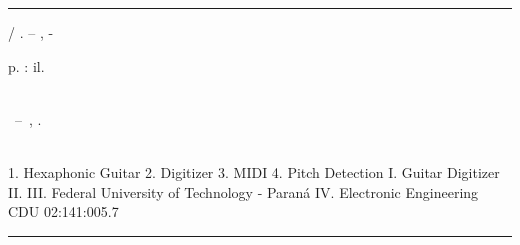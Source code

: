 %     
\begin{catalographiccard}
	\vspace*{\fill}					%
	\hrule							%
	\begin{center}					%
	\begin{minipage}[c]{12.5cm}		%

	\printauthor

	\hspace{0.5cm} \printtitle  / \printauthor. --
	\printlocal, \printdate-

	\hspace{0.5cm} \pageref{LastPage} p. : il.\\

	\hspace{0.5cm} \printadvisorLabel~\printadvisor\\

	\hspace{0.5cm}
	\parbox[t]{\textwidth}{\printtypeofdocument~--~\printinstitution,
	\printdate.}\\

	\hspace{0.5cm}
		1. Hexaphonic Guitar
		2. Digitizer
		3. MIDI
		4. Pitch Detection
		I. Guitar Digitizer
		II. \printadvisor
		III. Federal University of Technology - Paraná
		IV. Electronic Engineering\\

	\hspace{8.75cm} CDU 02:141:005.7\\

	\end{minipage}
	\end{center}
	\hrule
\end{catalographiccard}
